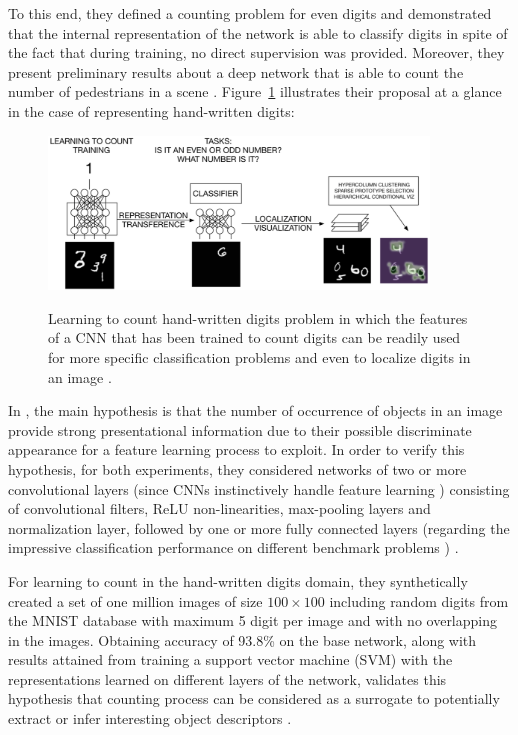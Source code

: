 To this end, they defined a counting problem for even digits and demonstrated that the internal representation of the network is able to classify digits in spite of the fact that during training, no direct supervision was provided. Moreover, they present preliminary results about a deep network that is able to count the number of pedestrians in a scene \cite{segui2015learning}. Figure~\ref{fig:santimnist} illustrates their proposal at a glance in the case of representing hand-written digits:
\begin{figure}[H]
	\centering
	{\includegraphics[width=0.9\textwidth]{images/santimnist}}
	\caption{Learning to count hand-written digits problem in which the features of a CNN that has been trained to count digits can be readily used for more specific classification problems and even to localize digits in an image \cite{segui2015learning}.}
	\label{fig:santimnist}
\end{figure}

In \cite{segui2015learning}, the main hypothesis is that the number of occurrence of objects in an image provide strong presentational information due to their possible discriminate appearance for a feature learning process to exploit. In order to verify this hypothesis, for both experiments, they considered networks of two or more convolutional layers (since CNNs instinctively handle feature learning \cite{lecun1989backpropagation}) consisting of convolutional filters, ReLU non-linearities, max-pooling layers and normalization layer, followed by one or more fully connected layers (regarding the impressive classification performance on different benchmark problems \cite{krizhevsky2012imagenet}) \cite{segui2015learning}. 

For learning to count in the hand-written digits domain, they synthetically created a set of one million images of size $100\times100$ including random digits from the MNIST database with maximum 5 digit per image and with no overlapping in the images. Obtaining accuracy of 93.8\% on the base network, along with results attained from training a support vector machine (SVM) with the representations learned on different layers of the network, validates this hypothesis that counting process can be considered as a surrogate to potentially extract or infer interesting object descriptors \cite{segui2015learning}. 

